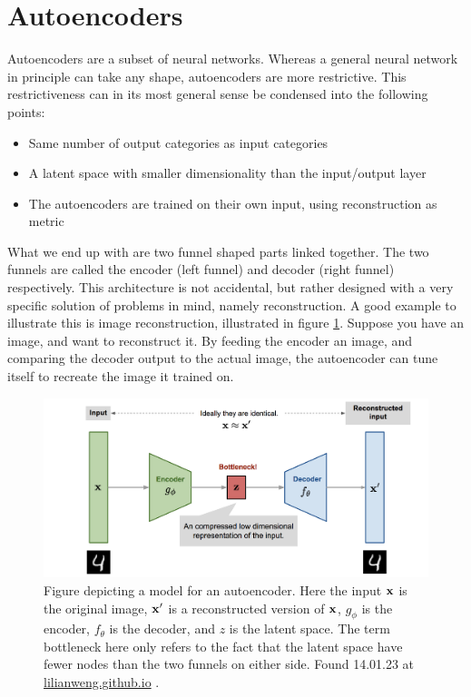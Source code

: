 \section{Autoencoders}\label{sec:autoencder_theory}

Autoencoders are a subset of neural networks. Whereas a general neural network
 in principle can take any shape, autoencoders are more restrictive.
This restrictiveness can in its most general sense be condensed 
into the following points:
\begin{itemize}
    \item Same number of output categories as input categories  
    \item A latent space with smaller dimensionality than the input/output layer  
    \item The autoencoders are trained on their own input, using reconstruction as metric
\end{itemize}
What we end up with are two funnel shaped parts linked together. The two funnels are 
called the encoder (left funnel) and decoder (right funnel) respectively. This architecture is not 
accidental, but rather designed with a very specific solution of problems in mind, namely reconstruction. 
A good example to illustrate this is image reconstruction, illustrated in figure \ref{fig:ae_denoise}. 
Suppose you have an image, and want to reconstruct it. By feeding the encoder an image, 
and comparing the decoder output to the actual image, the autoencoder can tune itself to recreate the image it trained on. 

\begin{figure}[h!]
    \includegraphics[width=\linewidth]{Figures/Machinelearning/autoencoder_imagedenoising.png}
    \caption[Conceptual autoencoder]{Figure depicting a model for an autoencoder. Here the input $\bf{x}$ is the original image,
    $\bf{x'}$ is a reconstructed version of $\bf{x}$, $g_{\phi}$ is the encoder, $f_{\theta}$ is the decoder, and $z$ is the 
    latent space. The term bottleneck here only refers to the fact that the latent space have fewer nodes than the two funnels on 
    either side. Found 14.01.23 at \href{https://lilianweng.github.io/posts/2018-08-12-vae}{lilianweng.github.io} \cite{weng2018VAE}. }
    \label{fig:ae_denoise}
\end{figure}

